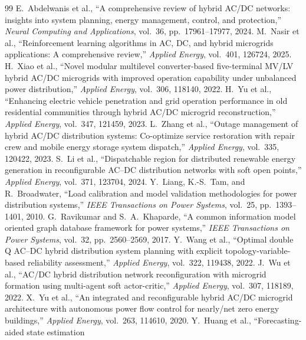 \documentclass[final,5p,times,twocolumn]{elsarticle}
\begin{document}
\begin{thebibliography}{99}
 E.~Abdelwanis et al., ``A
comprehensive review of hybrid AC/DC networks: insights into system planning,
energy management, control, and protection,'' \emph{Neural Computing and
Applications}, vol.~36, pp.~17961--17977, 2024.
 M.~Nasir et al., ``Reinforcement learning algorithms
in AC, DC, and hybrid microgrids applications: A comprehensive review,''
\emph{Applied Energy}, vol.~401, 126724, 2025.
 H.~Xiao et al., ``Novel modular multilevel converter-based
five-terminal MV/LV hybrid AC/DC microgrids with improved operation capability
under unbalanced power distribution,'' \emph{Applied Energy}, vol.~306,
118140, 2022.
 H.~Yu et al., ``Enhancing electric vehicle penetration and
grid operation performance in old residential communities through hybrid AC/DC
microgrid reconstruction,'' \emph{Applied Energy}, vol.~347, 121459, 2023.
 L.~Zhang et al., ``Outage management of hybrid AC/DC
distribution systems: Co-optimize service restoration with repair crew and
mobile energy storage system dispatch,'' \emph{Applied Energy}, vol.~335,
120422, 2023.
 S.~Li et al., ``Dispatchable region for distributed
renewable energy generation in reconfigurable AC--DC distribution networks with
soft open points,'' \emph{Applied Energy}, vol.~371, 123704, 2024.
 Y.~Liang, K.-S.~Tam, and R.~Broadwater,
``Load calibration and model validation methodologies for power distribution
systems,'' \emph{IEEE Transactions on Power Systems}, vol.~25,
pp.~1393--1401, 2010.
 G.~Ravikumar and S.~A.~Khaparde, ``A common
information model oriented graph database framework for power systems,''
\emph{IEEE Transactions on Power Systems}, vol.~32, pp.~2560--2569, 2017.
 Y.~Wang et al., ``Optimal double Q AC--DC hybrid
distribution system planning with explicit topology-variable-based reliability
assessment,'' \emph{Applied Energy}, vol.~322, 119438, 2022.
 J.~Wu et al., ``AC/DC hybrid distribution
network reconfiguration with microgrid formation using multi-agent soft
actor-critic,'' \emph{Applied Energy}, vol.~307, 118189, 2022.
 X.~Yu et al., ``An integrated and reconfigurable
hybrid AC/DC microgrid architecture with autonomous power flow control for
nearly/net zero energy buildings,'' \emph{Applied Energy}, vol.~263, 114610,
2020.
 Y.~Huang et al., ``Forecasting-aided state estimation

\end{thebibliography}
\end{document}
